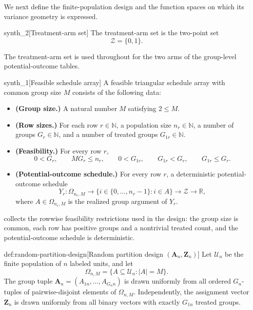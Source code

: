 We next define the finite-population design and the function spaces on which its variance geometry is expressed.

\begin{definitionv}{synth_2}[Treatment-arm set]
The treatment-arm set is the two-point set
\[
\mathcal Z=\{0,1\}.
\]
\end{definitionv}

The treatment-arm set  is used throughout for the two arms of the group-level potential-outcome tables.

\begin{definitionv}{synth_1}[Feasible schedule array]
A feasible triangular schedule array with common group size \(M\) consists of the following data:
\begin{itemize}
\item \textbf{(Group size.)} A natural number \(M\) satisfying \(2\le M\).
\item \textbf{(Row sizes.)} For each row \(r\in\mathbb N\), a population size \(n_r\in\mathbb N\), a number of groups \(G_r\in\mathbb N\), and a number of treated groups \(G_{1r}\in\mathbb N\).
\item \textbf{(Feasibility.)} For every row \(r\),
\[
0<G_r,\qquad M G_r\le n_r,\qquad 0<G_{1r},\qquad G_{1r}<G_r,\qquad G_{1r}\le G_r .
\]
\item \textbf{(Potential-outcome schedule.)} For every row \(r\), a deterministic potential-outcome schedule
\[
Y_r:\Omega_{n_r,M}\to \{i\in \{0,\ldots,n_r-1\}: i\in A\}\to \mathcal Z\to \mathbb R,
\]
where \(A\in\Omega_{n_r,M}\) is the realized group argument of \(Y_r\).
\end{itemize}
\end{definitionv}

 collects the rowwise feasibility restrictions used in the design: the group size is common, each row has positive groups and a nontrivial treated count, and the potential-outcome schedule is deterministic.

\begin{definitionv}{def:random-partition-design}[Random partition design \((\mathbf A_n,\mathbf Z_n)\)]
Let \(\mathcal U_n\) be the finite population of \(n\) labeled units, and let
\[
\Omega_{n,M}=\{A\subseteq \mathcal U_n: |A|=M\}.
\]
The group tuple \(\mathbf A_n=(A_{1n},\ldots,A_{G_n n})\) is drawn uniformly from all ordered \(G_n\)-tuples of pairwise-disjoint elements of \(\Omega_{n,M}\). Independently, the assignment vector \(\mathbf Z_n\) is drawn uniformly from all binary vectors with exactly \(G_{1n}\) treated groups.
\end{definitionv}

